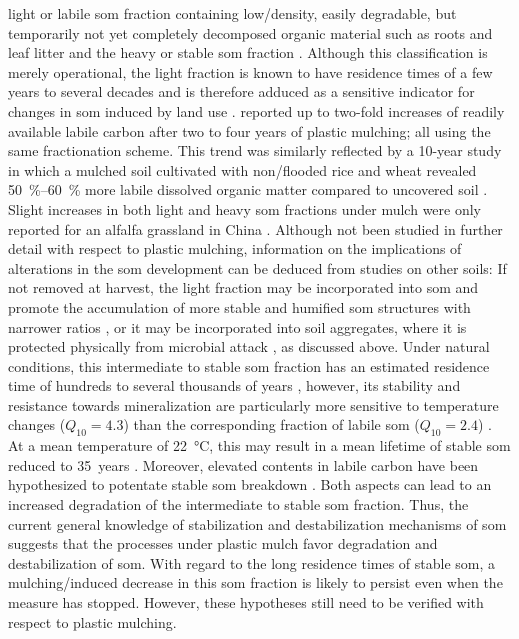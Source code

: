 light or labile \ac{som} fraction containing low\-/density, easily degradable, but temporarily not yet completely decomposed organic material such as roots and leaf litter and the heavy or stable \ac{som} fraction \citep{SollinsNet1984}. Although this classification is merely operational, the light fraction is known to have residence times of a few years to several decades \citep{vonLutzowStabilization2006} and is therefore adduced as a sensitive indicator for changes in \ac{som} induced by land use \citep{JanzenLightFraction1992}.  reported up to two-fold increases of readily available labile carbon after two to four years of plastic mulching; all using the same fractionation scheme. This trend was similarly reflected by a \num{10}-year study in which a mulched soil cultivated with non\-/flooded rice and wheat revealed \SIrange{50}{60}{\percent} more labile dissolved organic matter compared to uncovered soil \citep{TianLabile2013}. Slight increases in both light and heavy \ac{som} fractions under mulch were only reported for an alfalfa grassland in China \citep{JiaDynamics2006}. Although not been studied in further detail with respect to plastic mulching, information on the implications of alterations in the \ac{som} development can be deduced from studies on other soils: If not removed at harvest, the light fraction may be incorporated into \ac{som} and promote the accumulation of more stable and humified \ac{som} structures \citep{ZhouRidgefurrow2012} with narrower  ratios \citep{SollinsNet1984}, or it may be incorporated into soil aggregates, where it is protected physically from microbial attack \citep{SollinsStabilization1996,vonLutzowStabilization2006}, as discussed above. Under natural conditions, this intermediate to stable \ac{som} fraction has an estimated residence time of hundreds to several thousands of years \citep{vonLutzowStabilization2006}, however, its stability and resistance towards mineralization are particularly more sensitive to temperature changes ($Q_{10} = 4.3$) than the corresponding fraction of labile \ac{som} ($Q_{10} = 2.4$) \citep{LarionovaEffect2014,vonLutzowTemperature2009}. At a mean temperature of \SI{22}{\degreeCelsius}, this may result in a mean lifetime of stable \ac{som} reduced to \num{35}~years \citep{LarionovaEffect2014}. Moreover, elevated contents in labile carbon have been hypothesized to potentate stable \ac{som} breakdown \citep{GuenetEvidence2012}. Both aspects can lead to an increased degradation of the intermediate to stable \ac{som} fraction. Thus, the current general knowledge of stabilization and destabilization mechanisms of \ac{som} suggests that the processes under plastic mulch favor degradation and destabilization of \ac{som}. With regard to the long residence times of stable \ac{som}, a mulching\-/induced decrease in this \ac{som} fraction is likely to persist even when the measure has stopped. However, these hypotheses still need to be verified with respect to plastic mulching.

